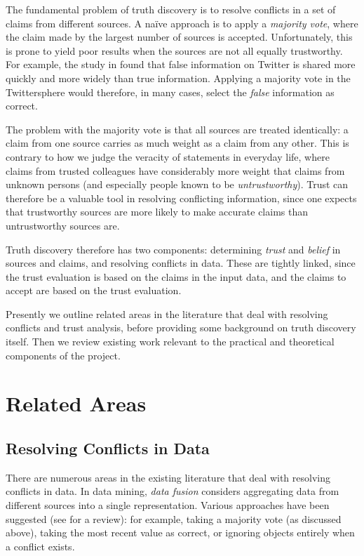 \documentclass[../main.tex]{subfiles}
\begin{document}
The fundamental problem of truth discovery is to resolve conflicts in a set of
claims from different sources. A na\"ive approach is to apply a \emph{majority
vote}, where the claim made by the largest number of sources is accepted.
Unfortunately, this is prone to yield poor results when the sources are not all
equally trustworthy. For example, the study in \cite{vosoughi} found that false
information on Twitter is shared more quickly and more widely than true
information. Applying a majority vote in the Twittersphere would therefore, in
many cases, select the \emph{false} information as correct.

The problem with the majority vote is that all sources are treated identically:
a claim from one source carries as much weight as a claim from any other. This
is contrary to how we judge the veracity of statements in everyday life, where
claims from trusted colleagues have considerably more weight that claims from
unknown persons (and especially people known to be \emph{untrustworthy}). Trust
can therefore be a valuable tool in resolving conflicting information, since
one expects that trustworthy sources are more likely to make accurate claims
than untrustworthy sources are.

Truth discovery therefore has two components: determining \emph{trust} and
\emph{belief} in sources and claims, and resolving conflicts in data. These are
tightly linked, since the trust evaluation is based on the claims in the input
data, and the claims to accept are based on the trust evaluation.

Presently we outline related areas in the literature that deal with resolving
conflicts and trust analysis, before providing some background on truth
discovery itself. Then we review existing work relevant to the practical and
theoretical components of the project.

\section{Related Areas}
\subsection{Resolving Conflicts in Data}

There are numerous areas in the existing literature that deal with resolving
conflicts in data. In data mining, \emph{data fusion} considers aggregating
data from different sources into a single representation. Various approaches
have been suggested (see \cite{bleiholder} for a review): for example, taking a
majority vote (as discussed above), taking the most recent value as correct, or
ignoring objects entirely when a conflict exists.
\end{document}
